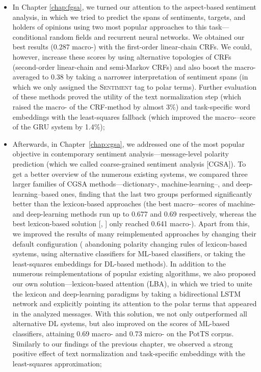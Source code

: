 \begin{itemize}
\item In Chapter \ref{chap:fgsa}, we turned our attention to the
  aspect-based sentiment analysis, in which we tried to predict the
  spans of sentiments, targets, and holders of opinions using two most
  popular approaches to this task---conditional random fields and
  recurrent neural networks.  We obtained our best results (0.287
  macro-\F{}) with the first-order linear-chain CRFs.  We could,
  however, increase these scores by using alternative topologies of
  CRFs (second-order linear-chain and semi-Markov CRFs) and also boost
  the macro-averaged \F{} to 0.38 by taking a narrower interpretation
  of sentiment spans (in which we only assigned the \textsc{Sentiment}
  tag to polar terms).  Further evaluation of these methods proved the
  utility of the text normalization step (which raised the macro-\F{}
  of the CRF-method by almost 3\%) and task-specific word embeddings
  with the least-squares fallback (which improved the
  macro-\F{}--score of the GRU system by 1.4\%);

\item Afterwards, in Chapter~\ref{chap:cgsa}, we addressed one of the
  most popular objective in contemporary sentiment
  analysis---message-level polarity prediction (which we called
  coarse-grained sentiment analysis [CGSA]).  To get a better overview
  of the numerous existing systems, we compared three larger families
  of CGSA methods---dictionary-, machine-learning--, and
  deep-learning--based ones, finding that the last two groups
  performed significantly better than the lexicon-based approaches
  (the best macro-\F{}--scores of machine- and deep-learning methods
  run up to 0.677 and 0.69 respectively, whereas the best
  lexicon-based solution [\citeauthor{Hu:04}, \citeyear{Hu:04}] only
  reached 0.641 macro-\F{}).  Apart from this, we improved the results
  of many reimplemented approaches by changing their default
  configuration (\eg{} abandoning polarity changing rules of
  lexicon-based systems, using alternative classifiers for ML-based
  classifiers, or taking the least-squares embeddings for DL-based
  methods).  In addition to the numerous reimplementations of popular
  existing algorithms, we also proposed our own
  solution---lexicon-based attention (LBA), in which we tried to unite
  the lexicon and deep-learning paradigms by taking a bidirectional
  LSTM network and explicitly pointing its attention to the polar
  terms that appeared in the analyzed messages.  With this solution,
  we not only outperformed all alternative DL systems, but also
  improved on the scores of ML-based classifiers, attaining 0.69
  macro-\F{} and 0.73 micro-\F{} on the PotTS corpus.  Similarly to
  our findings of the previous chapter, we observed a strong positive
  effect of text normalization and task-specific embeddings with the
  least-squares approximation;


\end{itemize}
